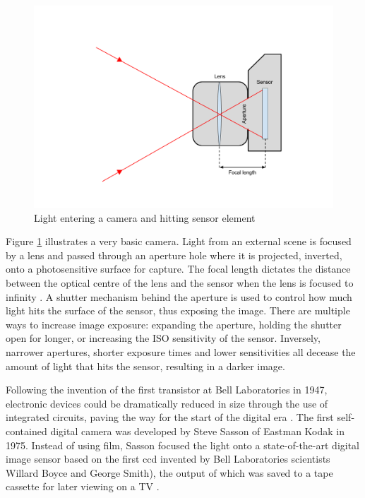\documentclass[a4paper]{report}
\begin{document}
\begin{figure}
  \centering
  \includegraphics[width=1\textwidth]{camera_physics_diagram.png}
  \caption{Light entering a camera and hitting sensor element}
  \label{fig:camera_physics_diagram}
\end{figure}

Figure \ref{fig:camera_physics_diagram} illustrates a very basic camera. Light from an external scene is focused by a lens and passed through an aperture hole where it is projected, inverted, onto a photosensitive surface for capture. The focal length dictates the distance between the optical centre of the lens and the sensor when the lens is focused to infinity \cite{4_pot_2010}. A shutter mechanism behind the aperture is used to control how much light hits the surface of the sensor, thus exposing the image. There are multiple ways to increase image exposure: expanding the aperture, holding the shutter open for longer, or increasing the ISO sensitivity of the sensor. Inversely, narrower apertures, shorter exposure times and lower sensitivities all decease the amount of light that hits the sensor, resulting in a darker image. 

Following the invention of the first transistor at Bell Laboratories in 1947, electronic devices could be dramatically reduced in size through the use of integrated circuits, paving the way for the start of the digital era \cite{5_computer_history_museum}. The first self-contained digital camera was developed by Steve Sasson of Eastman Kodak in 1975. Instead of using film, Sasson focused the light onto a state-of-the-art digital image sensor based on the first \gls{ccd} invented by Bell Laboratories scientists Willard Boyce and George Smith), the output of which was saved to a tape cassette for later viewing on a TV \cite{6_information_for_the_public,7_sasson_2007}.
\end{document}
